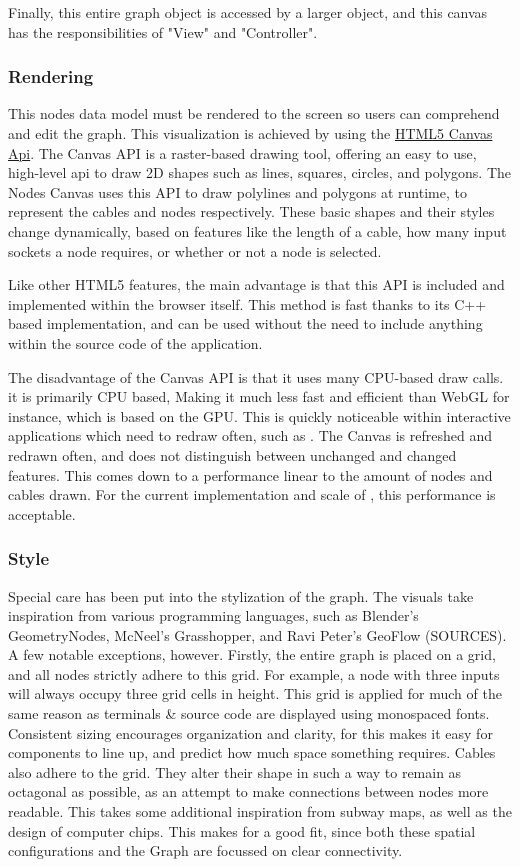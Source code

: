 Finally, this entire graph object is accessed by a larger  object, and this canvas has the responsibilities of "View" and "Controller". 

\subsubsection*{ Rendering }
This nodes data model must be rendered to the screen so users can comprehend and edit the graph. 
This visualization is achieved by using the \href{https://developer.mozilla.org/en-US/docs/Web/API/Canvas_API}{HTML5 Canvas Api}. 
The Canvas API is a raster-based drawing tool, offering an easy to use, high-level api to draw 2D shapes such as lines, squares, circles, and polygons. 
The Nodes Canvas uses this API to draw polylines and polygons at runtime, to represent the cables and nodes respectively. 
These basic shapes and their styles change dynamically, based on features like the length of a cable, how many input sockets a node requires, or whether or not a node is selected. 

Like other HTML5 features, the main advantage is that this API is included and implemented within the browser itself. This method is fast thanks to its C++ based implementation, and can be used without the need to include anything within the source code of the application.

The disadvantage of the Canvas API is that it uses many CPU-based draw calls. it is primarily CPU based, Making it much less fast and efficient than WebGL for instance, which is based on the GPU. 
This is quickly noticeable within interactive applications which need to redraw often, such as \geofront. 
The Canvas is refreshed and redrawn often, and does not distinguish between unchanged and changed features. 
This comes down to a performance linear to the amount of nodes and cables drawn. For the current implementation and scale of \geofront, this performance is acceptable. 

\subsubsection*{ Style }
Special care has been put into the stylization of the graph.
The visuals take inspiration from various programming languages, such as Blender's GeometryNodes, McNeel's Grasshopper, and Ravi Peter's GeoFlow (SOURCES). 
A few notable exceptions, however. 
Firstly, the entire graph is placed on a grid, and all nodes strictly adhere to this grid. 
For example, a node with three inputs will always occupy three grid cells in height. 
This grid is applied for much of the same reason as terminals \& source code are displayed using monospaced fonts. 
Consistent sizing encourages organization and clarity, for this makes it easy for components to line up, and predict how much space something requires.  
Cables also adhere to the grid. They alter their shape in such a way to remain as octagonal as possible, as an attempt to make connections between nodes more readable.
This takes some additional inspiration from subway maps, as well as the design of computer chips. This makes for a good fit, since both these spatial configurations and the \geofront Graph are focussed on clear connectivity.

